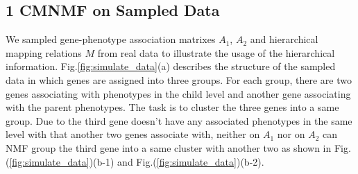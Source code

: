 \documentclass{bmcart}
\begin{document}
\subsection*{1 CMNMF on Sampled Data}
We sampled gene-phenotype association matrixes $A_1$, $A_2$ and hierarchical mapping relations $M$ from real data to illustrate the usage of the hierarchical information. Fig.\ref{fig:simulate_data}(a) describes the structure of the sampled data in which genes are assigned into three groups. For each group, there are two genes associating with phenotypes in the child level and another gene associating with the parent phenotypes. The task is to cluster the three genes into a same group. Due to the third gene doesn't have any associated phenotypes in the same level with that another two genes associate with, neither on $A_1$ nor on $A_2$ can NMF group the third gene into a same cluster with another two as shown in Fig.(\ref{fig:simulate_data})(b-1) and Fig.(\ref{fig:simulate_data})(b-2).
\end{document}
